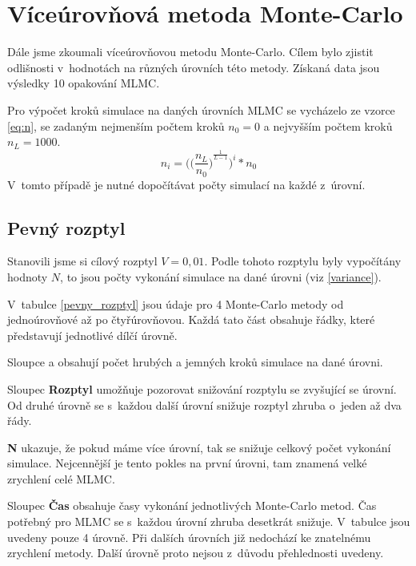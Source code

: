 \documentclass[FM, RP]{tulthesis}
\begin{document}

\section{Víceúrovňová metoda Monte-Carlo}
Dále jsme zkoumali víceúrovňovou metodu Monte-Carlo. Cílem bylo zjistit odlišnosti v~hodnotách na různých úrovních této metody. Získaná data jsou výsledky 10 opakování MLMC.

Pro výpočet kroků simulace na daných úrovních MLMC se vycházelo ze vzorce \ref{eq:n}, se zadaným nejmenším počtem kroků ${n}_{0} = 0$ a nejvyšším počtem kroků ${n}_{L} = 1000$.
\begin{equation}\label{eq:n}
{n}_{i} = \bigg({{\bigg(\frac{{n}_{L}}{{n}_{0}}\bigg)}^{\frac{1}{L-1}}}\bigg)^{i} * {n}_{0}
\end{equation}
V~tomto případě je nutné dopočítávat počty simulací na každé z~úrovní.
\subsection{Pevný rozptyl}
Stanovili jsme si cílový rozptyl $V = 0,01$. Podle tohoto rozptylu byly vypočítány hodnoty $N$, to jsou počty vykonání simulace na dané úrovni (viz \ref{variance}). 

V~tabulce \ref{pevny_rozptyl} jsou údaje pro 4 Monte-Carlo metody od jednoúrovňové až po čtyřúrovňovou. Každá tato část obsahuje řádky, které představují jednotlivé dílčí úrovně.

Sloupce  a  obsahují počet hrubých a jemných kroků simulace na dané úrovni.

Sloupec \textbf{Rozptyl} umožňuje pozorovat snižování rozptylu se zvyšující se úrovní. Od druhé úrovně se s~každou další úrovní snižuje rozptyl zhruba o~jeden až dva řády. 

\textbf{N} ukazuje, že pokud máme více úrovní, tak se snižuje celkový počet vykonání simulace. Nejcennější je tento pokles na první úrovni, tam znamená velké zrychlení celé MLMC.

Sloupec \textbf{Čas} obsahuje časy vykonání jednotlivých Monte-Carlo metod. Čas potřebný pro MLMC se s~každou úrovní zhruba desetkrát snižuje. V~tabulce jsou uvedeny pouze 4 úrovně. Při dalších úrovních již nedochází ke znatelnému zrychlení metody. Další úrovně proto nejsou z~důvodu přehlednosti uvedeny.
\end{document}
